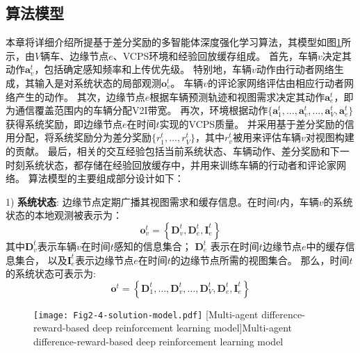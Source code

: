 \subsection[\hspace{-2pt}算法模型]{{ \hspace{-8pt}算法模型}}
本章将详细介绍所提基于差分奖励的多智能体深度强化学习算法，其模型如图\ref{fig 2-4}所示，由$V$辆车、边缘节点$e$、VCPS环境和经验回放缓存组成。
首先，车辆$v$决定其动作$\boldsymbol{a}_{v}^{t}$，包括确定感知频率和上传优先级。
特别地，车辆$v$动作由行动者网络生成，其输入是对系统状态的局部观测$\boldsymbol{o}_{v}^{t}$。
车辆$v$的评论家网络评估由相应行动者网络产生的动作。
其次，边缘节点$e$根据车辆预测轨迹和视图需求决定其动作$\boldsymbol{a}_{e}^{t}$，即为通信覆盖范围内的车辆分配V2I带宽。
再次，环境根据动作$\{ \boldsymbol{a}_{1}^{t}, \ldots, \boldsymbol{a}_{v}^{t}, \ldots, \boldsymbol{a}_{V}^{t}, \boldsymbol{a}_{e}^{t}\}$ 获得系统奖励，即边缘节点$e$在时间$t$实现的VCPS质量。
并采用基于差分奖励\cite{foerster2018counterfactual}的信用分配，将系统奖励分为差分奖励$\{r_1^t, \ldots, r_{V}^t\}$，其中$r_v^t$被用来评估车辆$v$对视图构建的贡献。
最后，相关的交互经验包括当前系统状态、车辆动作、差分奖励和下一时刻系统状态，都存储在经验回放缓存中，并用来训练车辆的行动者和评论家网络。
算法模型的主要组成部分设计如下：

1) \textbf{系统状态}: 边缘节点定期广播其视图需求和缓存信息。在时间$t$内，车辆$v$的系统状态的本地观测被表示为：
	\begin{equation}
		\boldsymbol{o}_{v}^{t}=\left\{\mathbf{D}_{v}^{t}, \mathbf{D}_{e}^{t}, \mathbf{I}_e^t\right\}
	\end{equation} 
	\noindent 其中$\mathbf{D}_{v}^{t}$表示车辆$v$在时间$t$感知的信息集合；
	$\mathbf{D}_{e}^{t}$ 表示在时间$t$边缘节点$e$中的缓存信息集合，
	以及$\mathbf{I}_e^t$表示边缘节点$e$在时间$t$的边缘节点所需的视图集合。
	那么，时间$t$的系统状态可表示为:
	\begin{equation}
		\boldsymbol{o}^{t}=\left\{\mathbf{D}_{1}^{t}, \ldots, \mathbf{D}_{v}^{t}, \ldots, \mathbf{D}_{V}^{t}, \mathbf{D}_{e}^{t}, \mathbf{I}_{e}^{t}\right\}
	\end{equation}
	
\begin{figure}[t]
\centering
  \texttt{[image: Fig2-4-solution-model.pdf]}
  [Multi-agent difference-reward-based deep reinforcement learning model]{Multi-agent difference-reward-based deep reinforcement learning model}
  \label{fig 2-4}
\end{figure}


